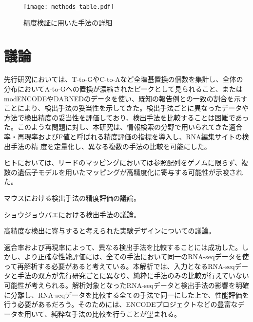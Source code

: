 \begin{figure}[!h]
	\begin{center}
		\texttt{[image: methods\_table.pdf]}
	\end{center}
	\vspace*{-1cm}
	\caption{精度検証に用いた手法の詳細}
\end{figure}

\newpage

\section{議論}
先行研究においては、T-to-GやC-to-Aなど全塩基置換の個数を集計し、全体の分布においてA-to-Gへの置換が濃縮されたピークとして見られること、またはmodENCODEやDARNEDのデータを使い、既知の報告例との一致の割合を示すことにより、検出手法の妥当性を示してきた。検出手法ごとに異なったデータや方法で検出精度の妥当性を評価しており、検出手法を比較することは困難であった。このような問題に対し、本研究は、情報検索の分野で用いられてきた適合率・再現率およびF値と呼ばれる精度評価の指標を導入し、RNA編集サイトの検出手法の精
度を定量化し、異なる複数の手法の比較を可能にした。
\par
ヒトにおいては、リードのマッピングにおいては参照配列をゲノムに限らず、複数の遺伝子モデルを用いたマッピングが高精度化に寄与する可能性が示唆された。
\par
マウスにおける検出手法の精度評価の議論。
\par
ショウジョウバエにおける検出手法の議論。
\par
高精度な検出に寄与すると考えられた実験デザインについての議論。
\par
適合率および再現率によって、異なる検出手法を比較することには成功した。しかし、より正確な性能評価には、全ての手法において同一のRNA-seqデータを使って再解析する必要があると考えている。本解析では、入力となるRNA-seqデータと手法の双方が先行研究ごとに異なり、純粋に手法のみの比較が行えていない可能性が考えられる。解析対象となったRNA-seqデータと検出手法の影響を明確に分離し、RNA-seqデータを比較する全ての手法で同一にした上で、性能評価を行う必要があるだろう。そのためには、ENCODEプロジェクトなどの豊富なデータを用いて、純粋な手法の比較を行うことが望まれる。

